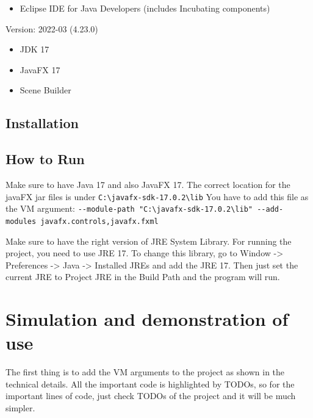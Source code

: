 \documentclass[
]{report}
\providecommand{\tightlist}{%
  \setlength{\itemsep}{0pt}\setlength{\parskip}{0pt}}
\begin{document}
\begin{itemize}
\tightlist
\item
  Eclipse IDE for Java Developers (includes Incubating components)
\end{itemize}

Version: 2022-03 (4.23.0)

\begin{itemize}
\tightlist
\item
  JDK 17
\item
  JavaFX 17
\item
  Scene Builder
\end{itemize}

\hypertarget{installation}{%
\section{Installation}\label{installation}}

\hypertarget{how-to-run}{%
\section{How to Run}\label{how-to-run}}

Make sure to have Java 17 and also JavaFX 17.
The correct location for the javaFX jar files is under \texttt{C:\textbackslash{}javafx-sdk-17.0.2\textbackslash{}lib}
You have to add this file as the VM argument: \texttt{-\/-module-path\ "C:\textbackslash{}javafx-sdk-17.0.2\textbackslash{}lib"\ -\/-add-modules\ javafx.controls,javafx.fxml}

Make sure to have the right version of JRE System Library. For running the project, you need to use JRE 17. To change this library, go to Window -\textgreater{} Preferences -\textgreater{} Java -\textgreater{} Installed JREs and add the JRE 17. Then just set the current JRE to Project JRE in the Build Path and the program will run.

\hypertarget{simulation-and-demonstration-of-use}{%
\chapter{Simulation and demonstration of use}\label{simulation-and-demonstration-of-use}}

The first thing is to add the VM arguments to the project as shown in the technical details. All the important code is highlighted by TODOs, so for the important lines of code, just check TODOs of the project and it will be much simpler.

  
\end{document}
